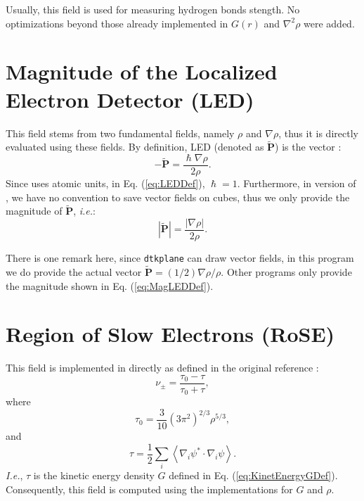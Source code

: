 Usually, this field is used for measuring hydrogen bonds stength.
No optimizations beyond those already implemented in $G(r)$ and $\nabla^2\rho$
were added.

\section{Magnitude of the Localized Electron Detector (LED)}
This field stems from two fundamental fields, namely $\rho$ and $\nabla\rho$, thus
it is directly evaluated using these fields. By definition, LED (denoted as $\tilde{\boldsymbol P}$) is the vector
\cite{bib:bohorquez2010a}:
%
\begin{equation}\label{eq:LEDDef}
-\tilde{\boldsymbol P}=\frac{\hslash\nabla\rho}{2\rho}.
\end{equation}
%
Since \DTK{} uses atomic units, in Eq. (\ref{eq:LEDDef}), $\hslash=1$.
Furthermore, in version \dtkversion{} of \DTK, we have no convention to save vector fields on cubes,
thus we only provide the magnitude of $\tilde{\boldsymbol P}$, \textit{i.e.}:
%
\begin{equation}\label{eq:MagLEDDef}
|\tilde{\boldsymbol P}|=\frac{|\nabla\rho|}{2\rho}.
\end{equation}
%

There is one remark here, since \texttt{dtkplane} can draw vector fields,
in this program we do provide the actual vector $\tilde{\boldsymbol P}=(1/2)\nabla\rho/\rho$.
Other programs only provide the magnitude shown in Eq. (\ref{eq:MagLEDDef}).

\section{Region of Slow Electrons (RoSE)}
This field is implemented in \DTK{} directly as defined in the original reference \cite{bib:jacobsen2013}:
%
\begin{equation}%
  \nu_{\pm}=\frac{\tau_0-\tau}{\tau_0+\tau},
\end{equation}
%
where
%
\begin{equation}%
  \tau_0=\frac{3}{10}\left( 3\pi^2 \right)^{2/3}\rho^{5/3},
\end{equation}
%
and
%
\begin{equation}%
  \tau=\frac{1}{2}\sum_i\left<\nabla_i\psi^*\cdot\nabla_i\psi\right>.
\end{equation}
%
\textit{I.e.}, $\tau$ is the kinetic energy density $G$ defined in Eq. (\ref{eq:KinetEnergyGDef}).
Consequently, this field is computed using the implementations for $G$ and $\rho$.

